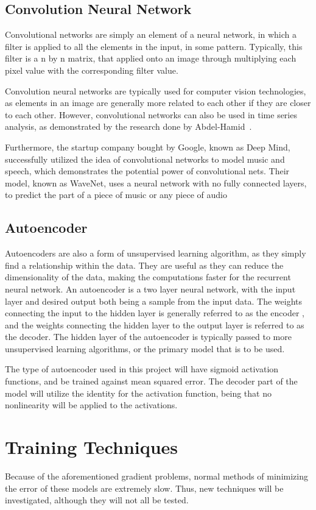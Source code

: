\documentclass{article}
\begin{document}
\subsection{Convolution Neural Network}
Convolutional networks are simply an element of a neural network, in which a
filter is applied to all the elements in the input, in some pattern. Typically,
this filter is a n by n matrix, that applied onto an image through multiplying
each pixel value with the corresponding filter value.

Convolution neural networks are typically used for computer vision technologies,
as elements in an image are generally more related to each other if they are
closer to each other. However, convolutional networks can also be used in time
series analysis, as demonstrated by the research done by
Abdel-Hamid~\cite{convrnn}.

Furthermore, the startup company bought by Google, known as Deep Mind,
successfully utilized the idea of convolutional networks to model music and
speech, which demonstrates the potential power of convolutional nets. Their
model, known as WaveNet, uses a neural network with no fully connected layers,
to predict the part of a piece of music or any piece of audio~\cite{wavenet}


\subsection{Autoencoder}
Autoencoders are also a form of unsupervised learning algorithm, as they simply
find a relationship within the data. They are useful as they can reduce the
dimensionality of the data, making the computations faster for the recurrent
neural network. An autoencoder is a two layer neural network, with the input
layer and desired output both being a sample from the input data. The weights
connecting the input to the hidden layer is generally referred to as the encoder
, and the weights connecting the hidden layer to the output layer is referred to
as the decoder. The hidden layer of the autoencoder is typically passed to more
unsupervised learning algorithms, or the primary model that is to be used.

The type of autoencoder used in this project will have sigmoid activation
functions, and be trained against mean squared error. The decoder part of the
model will utilize the identity for the activation function, being that no
nonlinearity will be applied to the activations.

\section{Training Techniques}
Because of the aforementioned gradient problems, normal methods of minimizing
the error of these models are extremely slow. Thus, new techniques will be
investigated, although they will not all be tested.
\end{document}
